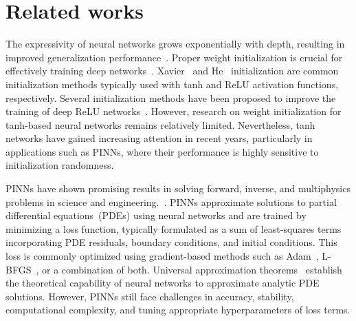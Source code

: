 \documentclass{article} \usepackage{iclr2025_conference,times}
\begin{document}
\section{Related works}


The expressivity of neural networks grows exponentially with depth, resulting in improved generalization performance~\citep{poole2016exponential, raghu2017expressive}. Proper weight initialization is crucial for effectively training deep networks~\citep{andrew2014exact, Dmytro2016All}. Xavier~\citep{glorot2010understanding} and He~\cite{he2015delving} initialization are common initialization methods typically used with tanh and ReLU activation functions, respectively. Several initialization methods have been proposed to improve the training of deep ReLU networks~\citep{lu2019dying, pmlr-v161-bachlechner21a, zhao2022zero, lee2024improved}. However, research on weight initialization for tanh-based neural networks remains relatively limited.
Nevertheless, tanh networks have gained increasing attention in recent years, particularly in applications such as PINNs, where their performance is highly sensitive to initialization randomness. 

PINNs have shown promising results in solving forward, inverse, and multiphysics problems in science and engineering.~\citep{MAO2020112789, Shukla2020, lu2021learning, karniadakis2021physics, YIN2021113603, BARARNIA2022105890, Cuomo2022, HANNA2022115100, HOSSEINI2023125908, Wu2023TheAO, Zhu2024}. 
PINNs approximate solutions to partial differential equations~(PDEs) using neural networks and are trained by minimizing a loss function, typically formulated as a sum of least-squares terms incorporating PDE residuals, boundary conditions, and initial conditions. This loss is commonly optimized using gradient-based methods such as Adam~\citep{kingma2014adam}, L-BFGS~\citep{liu1989limited}, or a combination of both. 
Universal approximation theorems~\citep{Cybenko1989, HORNIK1989359, HORNIK1991251, DBLP:journals/corr/abs-2006-08859, GULIYEV2018296, SHEN2022101, GULIYEV2018262, MAIOROV199981, YAROTSKY2017103, GRIPENBERG2003260} establish the theoretical capability of neural networks to approximate analytic PDE solutions. However, PINNs still face challenges in accuracy, stability, computational complexity, and tuning appropriate hyperparameters of loss terms. 
\end{document}
